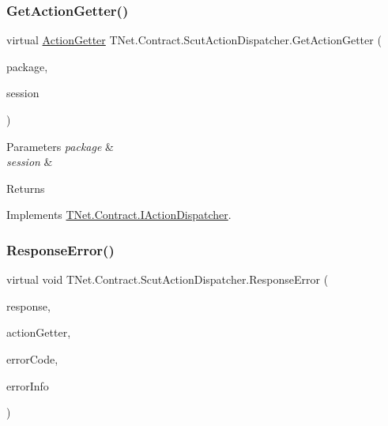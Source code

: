 \subsubsection{\texorpdfstring{Get\+Action\+Getter()}{GetActionGetter()}}
{\footnotesize\ttfamily virtual \mbox{\hyperlink{class_t_net_1_1_service_1_1_action_getter}{Action\+Getter}} T\+Net.\+Contract.\+Scut\+Action\+Dispatcher.\+Get\+Action\+Getter (\begin{DoxyParamCaption}\item[{\mbox{\hyperlink{class_t_net_1_1_contract_1_1_request_package}{Request\+Package}}}]{package,  }\item[{\mbox{\hyperlink{class_t_net_1_1_contract_1_1_game_session}{Game\+Session}}}]{session }\end{DoxyParamCaption})\hspace{0.3cm}{\ttfamily [virtual]}}






\begin{DoxyParams}{Parameters}
{\em package} & \\
\hline
{\em session} & \\
\hline
\end{DoxyParams}
\begin{DoxyReturn}{Returns}

\end{DoxyReturn}


Implements \mbox{\hyperlink{interface_t_net_1_1_contract_1_1_i_action_dispatcher_a6c8cd6e4355356d71fba54bc53d7a094}{T\+Net.\+Contract.\+I\+Action\+Dispatcher}}.

\mbox{\label{class_t_net_1_1_contract_1_1_scut_action_dispatcher_ad0983174f224f8b03e9fb0d3bc10579d}} 
\subsubsection{\texorpdfstring{Response\+Error()}{ResponseError()}}
{\footnotesize\ttfamily virtual void T\+Net.\+Contract.\+Scut\+Action\+Dispatcher.\+Response\+Error (\begin{DoxyParamCaption}\item[{\mbox{\hyperlink{class_t_net_1_1_service_1_1_base_game_response}{Base\+Game\+Response}}}]{response,  }\item[{\mbox{\hyperlink{class_t_net_1_1_service_1_1_action_getter}{Action\+Getter}}}]{action\+Getter,  }\item[{int}]{error\+Code,  }\item[{string}]{error\+Info }\end{DoxyParamCaption})\hspace{0.3cm}{\ttfamily [virtual]}}






